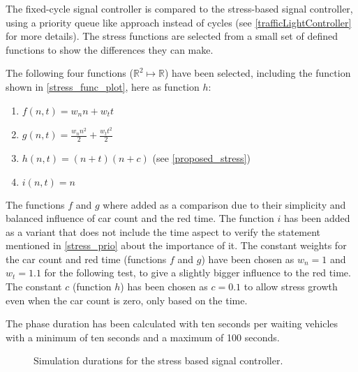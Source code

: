 The fixed-cycle signal controller is compared to the stress-based signal controller, using a priority queue like approach instead of cycles (see \autoref{trafficLightController} for more details). The stress functions are selected from a small set of defined functions to show the differences they can make.

The following four functions ($\mathbb{R}^2 \mapsto \mathbb{R}$) have been selected, including the function shown in \autoref{stress_func_plot}, here as function $h$:

\begin{enumerate}
	\item $f(n, t) = w_n n + w_tt$
	\item $g(n, t) = \frac{w_n n^2}{2} + \frac{w_t t^2}{2}$
	\item $h(n, t) = (n + t)(n + c)$ (see \autoref{proposed_stress})
	\item $i(n, t) = n$
\end{enumerate}

The functions $f$ and $g$ where added as a comparison due to their simplicity and balanced influence of car count and the red time. The function $i$ has been added as a variant that does not include the time aspect to verify the statement mentioned in \autoref{stress_prio} about the importance of it. The constant weights for the car count and red time (functions $f$ and $g$) have been chosen as $w_n = 1$ and $w_t = 1.1$ for the following test, to give a slightly bigger influence to the red time. The constant $c$ (function $h$) has been chosen as $c = 0.1$ to allow stress growth even when the car count is zero, only based on the time.

The phase duration has been calculated with ten seconds per waiting vehicles with a minimum of ten seconds and a maximum of 100 seconds.

\begin{figure}
\centering	
{}
\label{stress_based_results}
\caption{Simulation durations for the stress based signal controller.}
\end{figure}

